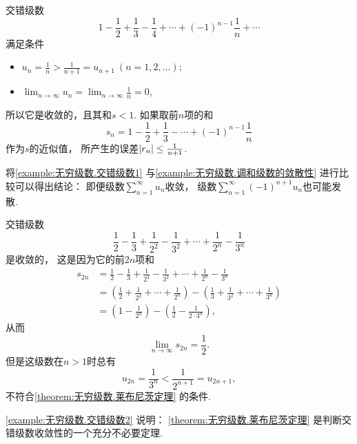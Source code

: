 \begin{example}\label{example:无穷级数.交错级数1}
交错级数\begin{equation*}
	1 - \frac{1}{2} + \frac{1}{3} - \frac{1}{4} + \dotsb + (-1)^{n-1} \frac{1}{n} + \dotsb
\end{equation*}
满足条件\begin{itemize}
	\item \(u_n = \frac{1}{n} > \frac{1}{n+1} = u_{n+1}\ (n=1,2,\dotsc)\);
	\item \(\lim_{n\to\infty} u_n = \lim_{n\to\infty} \frac{1}{n} = 0\),
\end{itemize}
所以它是收敛的，且其和\(s < 1\).
如果取前\(n\)项的和\begin{equation*}
	s_n = 1 - \frac{1}{2} + \frac{1}{3} - \dotsb + (-1)^{n-1} \frac{1}{n}
\end{equation*}作为\(s\)的近似值，
所产生的误差\(\abs{r_n} \leq \frac{1}{n+1}\).
\end{example}
\begin{remark}
将\cref{example:无穷级数.交错级数1}
与\cref{example:无穷级数.调和级数的敛散性} 进行比较可以得出结论：
即便级数\(\sum_{n=1}^\infty u_n\)收敛，
级数\(\sum_{n=1}^\infty (-1)^{n+1} u_n\)也可能发散.
\end{remark}

\begin{example}\label{example:无穷级数.交错级数2}
交错级数\begin{equation*}
	\frac{1}{2} - \frac{1}{3}
	+ \frac{1}{2^2} - \frac{1}{3^2}
	+ \dotsm + \frac{1}{2^n} - \frac{1}{3^n}
\end{equation*}是收敛的，
这是因为它的前\(2n\)项和\begin{align*}
	s_{2n} &= \frac{1}{2} - \frac{1}{3}
	+ \frac{1}{2^2} - \frac{1}{3^2}
	+ \dotsm + \frac{1}{2^n} - \frac{1}{3^n} \\
	&= \left(\frac{1}{2} + \frac{1}{2^2} + \dotsm + \frac{1}{2^n}\right)
	- \left(\frac{1}{3} + \frac{1}{3^2} + \dotsm + \frac{1}{3^n}\right) \\
	&= \left(1 - \frac{1}{2^n}\right)
	- \left(\frac{1}{2} - \frac{1}{2\cdot3^n}\right),
\end{align*}
从而\begin{equation*}
	\lim_{n\to\infty} s_{2n} = \frac{1}{2}.
\end{equation*}
但是这级数在\(n>1\)时总有\begin{equation*}
	u_{2n} = \frac{1}{3^n} < \frac{1}{2^{n+1}} = u_{2n+1},
\end{equation*}不符合\cref{theorem:无穷级数.莱布尼茨定理} 的条件.
\end{example}
\begin{remark}
\cref{example:无穷级数.交错级数2} 说明：
\cref{theorem:无穷级数.莱布尼茨定理} 是判断交错级数收敛性的一个充分不必要定理.
\end{remark}

